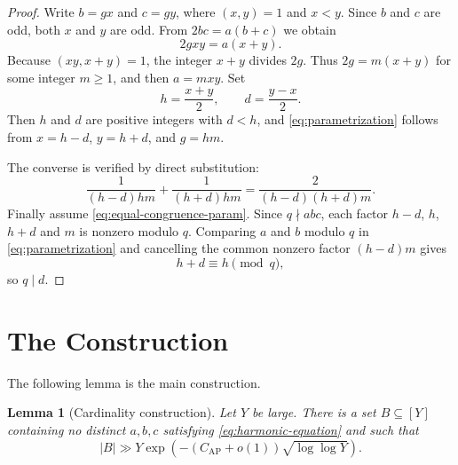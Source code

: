 \documentclass[11pt]{article}
\theoremstyle{plain}
\newtheorem{lemma}[theorem]{Lemma}
\theoremstyle{remark}
\newcommand{\AP}{\mathrm{AP}}
\begin{document}
\begin{proof}
Write $b=gx$ and $c=gy$, where $(x,y)=1$ and $x<y$.  Since $b$ and $c$ are odd, both $x$ and $y$ are odd.  From $2bc=a(b+c)$ we obtain
\[
  2gxy=a(x+y).
\]
Because $(xy,x+y)=1$, the integer $x+y$ divides $2g$.  Thus $2g=m(x+y)$ for some integer $m\ge 1$, and then $a=mxy$.  Set
\[
  h=\frac{x+y}{2},\qquad d=\frac{y-x}{2}.
\]
Then $h$ and $d$ are positive integers with $d<h$, and \eqref{eq:parametrization} follows from $x=h-d$, $y=h+d$, and $g=hm$.

The converse is verified by direct substitution:
\[
  \frac1{(h-d)hm}+\frac1{(h+d)hm}
  =\frac{2}{(h-d)(h+d)m}.
\]
Finally assume \eqref{eq:equal-congruence-param}.  Since $q\nmid abc$, each factor $h-d$, $h$, $h+d$ and $m$ is nonzero modulo $q$.  Comparing $a$ and $b$ modulo $q$ in \eqref{eq:parametrization} and cancelling the common nonzero factor $(h-d)m$ gives
\[
  h+d\equiv h\pmod q,
\]
so $q\mid d$.
\end{proof}

\section{The Construction}

The following lemma is the main construction.

\begin{lemma}[Cardinality construction]\label{lem:cardinality-core}
Let $Y$ be large.  There is a set $B\subseteq [Y]$ containing no distinct $a,b,c$ satisfying \eqref{eq:harmonic-equation} and such that
\begin{equation}\label{eq:core-cardinality}
  |B|
  \gg
  Y\exp\!\left(-(C_{\AP}+o(1))\sqrt{\log\log Y}\right).
\end{equation}
\end{lemma}
\end{document}
